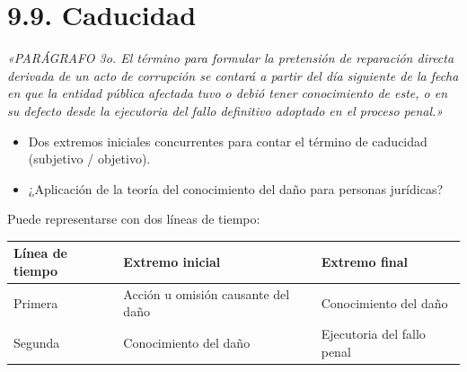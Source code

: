 \section{9.9. Caducidad}
\begin{cita}
\textit{«PARÁGRAFO 3o. El término para formular la pretensión de reparación directa derivada de un acto de corrupción se contará a partir del día siguiente de la fecha en que la entidad pública afectada tuvo o debió tener conocimiento de este, o en su defecto desde la ejecutoria del fallo definitivo adoptado en el proceso penal.»}
\end{cita}
\begin{itemize}
\item Dos extremos iniciales concurrentes para contar el término de caducidad (subjetivo / objetivo).
\item ¿Aplicación de la teoría del conocimiento del daño para personas jurídicas?
\end{itemize}
Puede representarse con dos líneas de tiempo:

\begin{tabla}
\begin{longtable}{|>{\raggedright\arraybackslash}m{}|>{\raggedright\arraybackslash}m{}|>{\raggedright\arraybackslash}m{}|}
\hline
\cellcolor[HTML]{1F3864}\textcolor[HTML]{FFFFFF}{\textbf{Línea de tiempo}} & \cellcolor[HTML]{1F3864}\textcolor[HTML]{FFFFFF}{\textbf{Extremo inicial}} & \cellcolor[HTML]{1F3864}\textcolor[HTML]{FFFFFF}{\textbf{Extremo final}} \\ \hline
Primera & Acción u omisión causante del daño & Conocimiento del daño \\ \hline
\cellcolor[HTML]{F2F5FA}Segunda & \cellcolor[HTML]{F2F5FA}Conocimiento del daño & \cellcolor[HTML]{F2F5FA}Ejecutoria del fallo penal \\ \hline
\end{longtable}
\end{tabla}
